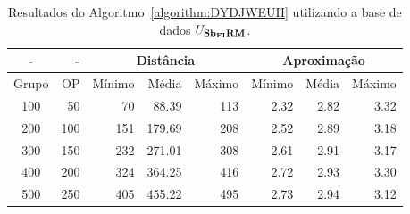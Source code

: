 \begin{table}[!htb]
  \caption{Resultados do Algoritmo~\ref{algorithm:DYDJWEUH} utilizando a base de dados $U_{\textbf{Sb\textsubscript{FI}RM}}{}$.}
  \label{table:IEBGYPHS}
  \centering
  \begin{tabular}{|c|r|r|r|r|r|r|r|}
    \hline
      -      &  -   & \multicolumn{3}{c|}{Distância}             & \multicolumn{3}{c|}{Aproximação}           \\ \hline
    Grupo    & OP   & Mínimo       & Média        & Máximo       & Mínimo       & Média        & Máximo       \\ \hline  
    100      & 50   & 70           &  88.39       & 113          & 2.32         & 2.82         & 3.32         \\ \hline
    200      & 100  & 151          & 179.69       & 208          & 2.52         & 2.89         & 3.18         \\ \hline
    300      & 150  & 232          & 271.01       & 308          & 2.61         & 2.91         & 3.17         \\ \hline
    400      & 200  & 324          & 364.25       & 416          & 2.72         & 2.93         & 3.30         \\ \hline
    500      & 250  & 405          & 455.22       & 495          & 2.73         & 2.94         & 3.12         \\ \hline    
  \end{tabular}
\end{table}